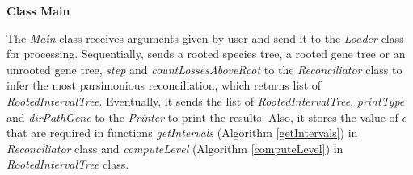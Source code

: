 \noindent \textbf{Class Main}

The \emph{Main} class receives arguments given by user and send it to the \emph{Loader} class for processing. Sequentially, sends a rooted species tree, a rooted gene tree or an unrooted gene tree, \emph{step} and \emph{countLossesAboveRoot} to the \emph{Reconciliator} class to infer the most parsimonious reconciliation, which returns list of \emph{RootedIntervalTree}. Eventually, it sends the list of \emph{RootedIntervalTree}, \emph{printType} and \emph{dirPathGene} to the \emph{Printer} to print the results. Also, it stores the value of $\epsilon$ that are required in functions \emph{getIntervals} (Algorithm \ref{getIntervals}) in \emph{Reconciliator} class and \emph{computeLevel} (Algorithm \ref{computeLevel}) in \emph{RootedIntervalTree} class.  \\
